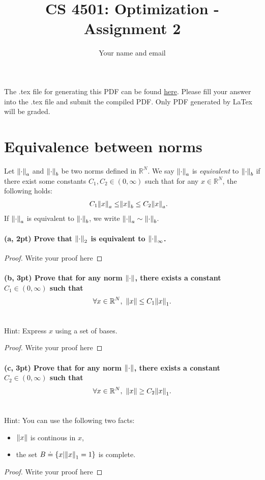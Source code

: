 \documentclass[11pt]{article}
\newcommand{\R}{\mathbb{R}}
\begin{document}
\title{CS 4501: Optimization - Assignment 2}
\author{Your name and email}
\date{}
\maketitle

The .tex file for generating this PDF can be found \href{https://github.com/ShangtongZhang/ShangtongZhang.github.io/tree/master/assets/pdf/cs_4501_fall_23/assignment2}{here}.
Please fill your answer into the .tex file and submit the compiled PDF.
Only PDF generated by LaTex will be graded.

\section{Equivalence between norms}
Let $\norm{\cdot}_a$ and $\norm{\cdot}_b$ be two norms defined in $\R^N$.
We say $\norm{\cdot}_a$ is \emph{equivalent} to $\norm{\cdot}_b$ if there exist some constants $C_1, C_2 \in (0, \infty)$ such that for any 
$x \in \R^N$,
the following holds:
\begin{align}
  C_1 \norm{x}_a \leq& \norm{x}_b \leq C_2 \norm{x}_a.
\end{align}
If $\norm{\cdot}_a$ is equivalent to $\norm{\cdot}_b$,
we write $\norm{\cdot}_a \sim \norm{\cdot}_b$.
\paragraph{(a, 2pt) Prove that $\norm{\cdot}_2$ is equivalent to $\norm{\cdot}_\infty$.}
\begin{proof}
  Write your proof here
\end{proof}

\paragraph{(b, 3pt) Prove that for any norm $\norm{\cdot}$, there exists a constant $C_1 \in (0, \infty)$ such that $$\forall x \in \R^N, \,\, \norm{x} \leq C_1 \norm{x}_1.$$} \mbox{}\\
Hint: Express $x$ using a set of bases.
\begin{proof}
  Write your proof here
\end{proof}

\paragraph{(c, 3pt) Prove that for any norm $\norm{\cdot}$, there exists a constant $C_2 \in (0, \infty)$ such that $$\forall x \in \R^N, \,\, \norm{x} \geq C_2 \norm{x}_1.$$} \mbox{} \\
Hint: You can use the following two facts:
\begin{itemize}
  \item $\norm{x}$ is continous in $x$,
  \item the set $B \doteq \qty{x | \norm{x}_1 = 1}$ is complete. 
\end{itemize}
\begin{proof}
  Write your proof here
\end{proof}
\end{document}
